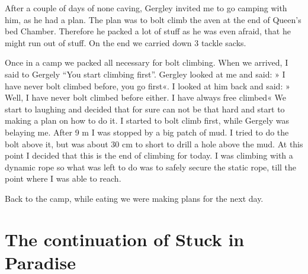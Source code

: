 After a couple of days of none caving, Gergley invited me to go camping
with him, as he had a plan. The plan was to bolt climb the aven at the
end of Queen's bed Chamber. Therefore he packed a lot of stuff as he was
even afraid, that he might run out of stuff. On the end we carried down
3 tackle sacks.

Once in a camp we packed all necessary for bolt climbing. When we
arrived, I said to Gergely ``You start climbing first''. Gergley looked
at me and said: » I have never bolt climbed before, you go first«. I
looked at him back and said: » Well, I have never bolt climbed before
either. I have always free climbed« We start to laughing and decided
that for sure can not be that hard and start to making a plan on how to
do it. I started to bolt climb first, while Gergely was belaying me.
After 9 m I was stopped by a big patch of mud. I tried to do the bolt
above it, but was about 30 cm to short to drill a hole above the mud. At
this point I decided that this is the end of climbing for today. I was
climbing with a dynamic rope so what was left to do was to safely secure
the static rope, till the point where I was able to reach.

Back to the camp, while eating we were making plans for the next day.


\section{The continuation of Stuck in
Paradise}\label{the-continuation-of-stuck-in-paradise}


